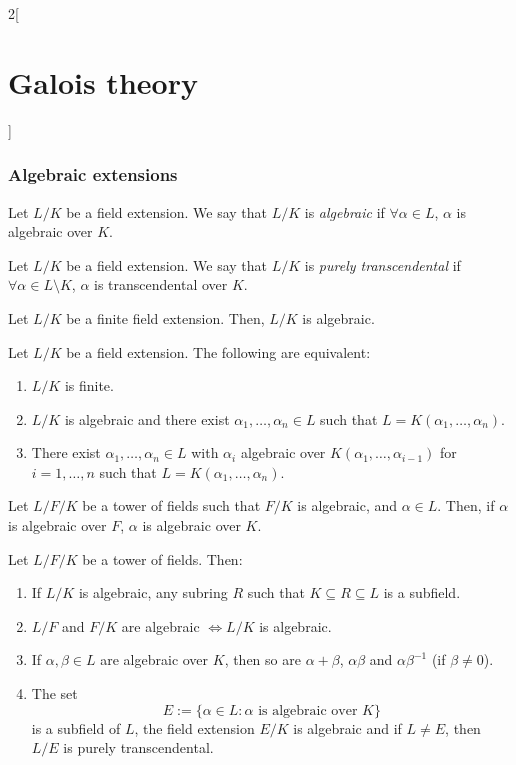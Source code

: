 \documentclass[../../../main.tex]{subfiles}
\begin{document}
\begin{multicols}{2}[\section{Galois theory}]
  \subsubsection{Algebraic extensions}
  \begin{definition}
    Let $L/K$ be a field extension. We say that $L/K$ is \emph{algebraic} if $\forall\alpha\in L$, $\alpha$ is algebraic over $K$.
  \end{definition}
  \begin{definition}
    Let $L/K$ be a field extension. We say that $L/K$ is \emph{purely transcendental} if $\forall\alpha\in L\setminus K$, $\alpha$ is transcendental over $K$.
  \end{definition}
  \begin{lemma}
    Let $L/K$ be a finite field extension. Then, $L/K$ is algebraic.
  \end{lemma}
  \begin{prop}
    Let $L/K$ be a field extension. The following are equivalent:
    \begin{enumerate}
      \item $L/K$ is finite.
      \item $L/K$ is algebraic and there exist $\alpha_1,\ldots,\alpha_n\in L$ such that $L=K(\alpha_1,\ldots,\alpha_n)$.
      \item There exist $\alpha_1,\ldots,\alpha_n\in L$ with $\alpha_i$ algebraic over $K(\alpha_1,\ldots,\alpha_{i-1})$ for $i=1,\ldots,n$ such that $L=K(\alpha_1,\ldots,\alpha_n)$.
    \end{enumerate}
  \end{prop}
  \begin{prop}
    Let $L/F/K$ be a tower of fields such that $F/K$ is algebraic, and $\alpha\in L$. Then, if $\alpha$ is algebraic over $F$, $\alpha$ is algebraic over $K$.
  \end{prop}
  \begin{prop}
    Let $L/F/K$ be a tower of fields. Then:
    \begin{enumerate}
      \item If $L/K$ is algebraic, any subring $R$ such that $K\subseteq R\subseteq L$ is a subfield.
      \item $L/F$ and $F/K$ are algebraic $\iff L/K$ is algebraic.
      \item If $\alpha,\beta\in L$ are algebraic over $K$, then so are $\alpha+\beta$, $\alpha\beta$ and $\alpha\beta^{-1}$ (if $\beta\ne 0$).
      \item The set $$E:=\{\alpha\in L:\alpha\text{ is algebraic over }K\}$$ is a subfield of $L$, the field extension $E/K$ is algebraic and if $L\ne E$, then $L/E$ is purely transcendental.
    \end{enumerate}
  \end{prop}

\end{multicols}
\end{document}
